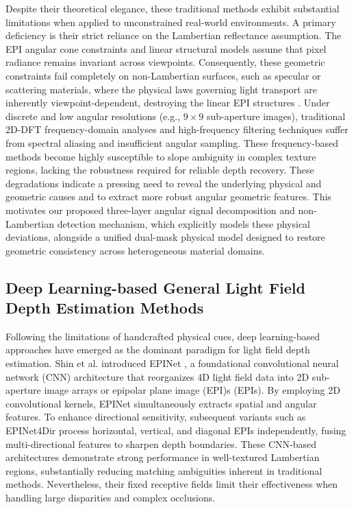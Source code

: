 Despite their theoretical elegance, these traditional methods exhibit substantial limitations when applied to unconstrained real-world environments. A primary deficiency is their strict reliance on the Lambertian reflectance assumption. The EPI angular cone constraints and linear structural models assume that pixel radiance remains invariant across viewpoints. Consequently, these geometric constraints fail completely on non-Lambertian surfaces, such as specular or scattering materials, where the physical laws governing light transport are inherently viewpoint-dependent, destroying the linear EPI structures . Under discrete and low angular resolutions (e.g., $9 \times 9$ sub-aperture images), traditional 2D-DFT frequency-domain analyses and high-frequency filtering techniques suffer from spectral aliasing and insufficient angular sampling. These frequency-based methods become highly susceptible to slope ambiguity in complex texture regions, lacking the robustness required for reliable depth recovery. These degradations indicate a pressing need to reveal the underlying physical and geometric causes and to extract more robust angular geometric features. This motivates our proposed three-layer angular signal decomposition and non-Lambertian detection mechanism, which explicitly models these physical deviations, alongside a unified dual-mask physical model designed to restore geometric consistency across heterogeneous material domains.

\subsection{Deep Learning-based General Light Field Depth Estimation Methods}

Following the limitations of handcrafted physical cues, deep learning-based approaches have emerged as the dominant paradigm for light field depth estimation. Shin et al. introduced EPINet , a foundational convolutional neural network (CNN) architecture that reorganizes 4D light field data into 2D sub-aperture image arrays or epipolar plane image (EPI)s (EPIs). By employing 2D convolutional kernels, EPINet simultaneously extracts spatial and angular features. To enhance directional sensitivity, subsequent variants such as EPINet4Dir process horizontal, vertical, and diagonal EPIs independently, fusing multi-directional features to sharpen depth boundaries. These CNN-based architectures demonstrate strong performance in well-textured Lambertian regions, substantially reducing matching ambiguities inherent in traditional methods. Nevertheless, their fixed receptive fields limit their effectiveness when handling large disparities and complex occlusions.

